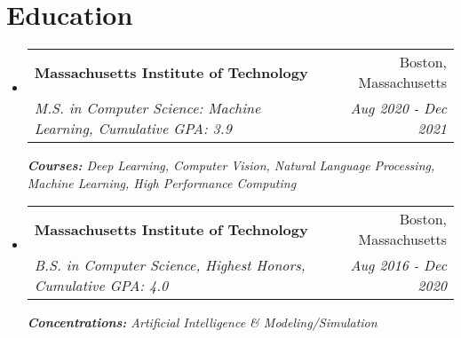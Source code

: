 \documentclass[a4paper,20pt]{article}
\makeatletter
\newcommand{\resumeSubheading}[4]{
  \vspace{-1pt}\item
    \begin{tabular*}{0.97\textwidth}{l@{\extracolsep{\fill}}r}
      \textbf{#1} & #2 \\
      \textit{#3} & \textit{#4} \\
    \end{tabular*}\vspace{-5pt}
}
\newcommand{\resumeSubHeadingListStart}{\begin{itemize}[label={}, leftmargin=5.0mm]}
\newcommand{\resumeSubHeadingListEnd}{\end{itemize}}
\makeatother
\begin{document}
\section{Education}
  \resumeSubHeadingListStart
    \resumeSubheading
      {Massachusetts Institute of Technology}{Boston, Massachusetts}
      {M.S. in Computer Science: Machine Learning, Cumulative GPA: 3.9}{Aug 2020 - Dec 2021}
      {\scriptsize \textit{ \footnotesize{\newline{}\textbf{Courses:} Deep Learning, Computer Vision, Natural Language Processing,
Machine Learning, High Performance Computing}}}
      
      \resumeSubheading
      {Massachusetts Institute of Technology}{Boston, Massachusetts}
      {B.S. in Computer Science, Highest Honors, Cumulative GPA: 4.0}{Aug 2016 - Dec 2020}
      {\scriptsize \textit{ \footnotesize{\newline{}\textbf{Concentrations:} Artificial Intelligence \& Modeling/Simulation}}}
      \vspace{-0.7em}
    \resumeSubHeadingListEnd

\vspace{-5pt}
\end{document}
